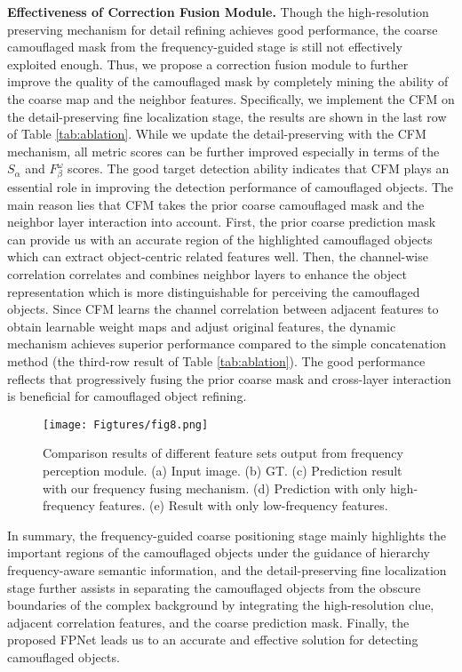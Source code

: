 \documentclass[sigconf,screen]{acmart}
\begin{document}
\noindent \textbf{Effectiveness of Correction Fusion Module.}
Though the high-resolution preserving mechanism for detail refining achieves good performance, the coarse camouflaged mask from the frequency-guided stage is still not effectively exploited enough. Thus, we propose a correction fusion module to further improve the quality of the camouflaged mask by completely mining the ability of the coarse map and the neighbor features. Specifically, we implement the CFM on the detail-preserving fine localization stage, the results are shown in the last row of Table \ref{tab:ablation}. While we update the detail-preserving with the CFM mechanism, all metric scores can be further improved especially in terms of the $S_\alpha$ and $F_\beta^\omega$ scores. The good target detection ability indicates that CFM plays an essential role in improving the detection performance of camouflaged objects. The main reason lies that CFM takes the prior coarse camouflaged mask and the neighbor layer interaction into account. First, the prior coarse prediction mask can provide us with an accurate region of the highlighted camouflaged objects which can extract object-centric related features well. 
Then, the channel-wise correlation correlates and combines neighbor layers to enhance the object representation which is more distinguishable for perceiving the camouflaged objects. 
Since CFM learns the channel correlation between adjacent features to obtain learnable weight maps and adjust original features, the dynamic mechanism achieves superior performance compared to the simple concatenation method (the third-row result of Table \ref{tab:ablation}). 
The good performance reflects that progressively fusing the prior coarse mask and cross-layer interaction is beneficial for camouflaged object refining.



\begin{figure}[!t]
\centering
\texttt{[image: Figtures/fig8.png]}
\caption{Comparison results of different feature sets output from frequency perception module. (a) Input image. (b) GT. (c) Prediction result with our frequency fusing mechanism. (d) Prediction with only high-frequency features. (e) Result with only low-frequency features.}
\label{fig:fre1}
\end{figure}

In summary, the frequency-guided coarse positioning stage mainly highlights the important regions of the camouflaged objects under the guidance of hierarchy frequency-aware semantic information, and the detail-preserving fine localization stage further assists in separating the camouflaged objects from the obscure boundaries of the complex background by integrating the high-resolution clue, adjacent correlation features, and the coarse prediction mask. Finally, the proposed FPNet leads us to an accurate and effective solution for detecting camouflaged objects.
\end{document}
